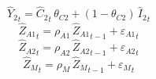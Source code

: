 \begin{dmath}
{{\hat{Y}_{2}}}_{t}={{\hat{C}_{2}}}_{t}\, {{\theta_{C2}}}+\left(1-{{\theta_{C2}}}\right)\, {{\hat{I}_{2}}}_{t}
\end{dmath}
\begin{dmath}
{{\hat{Z}_{A1}}}_{t}={{\rho_{A1}}}\, {{\hat{Z}_{A1}}}_{t-1}+{{\varepsilon_{A1}}}_{t}
\end{dmath}
\begin{dmath}
{{\hat{Z}_{A2}}}_{t}={{\rho_{A2}}}\, {{\hat{Z}_{A2}}}_{t-1}+{{\varepsilon_{A2}}}_{t}
\end{dmath}
\begin{dmath}
{{\hat{Z}_M}}_{t}={{\rho_{M}}}\, {{\hat{Z}_M}}_{t-1}+{{\varepsilon_{M}}}_{t}
\end{dmath}
